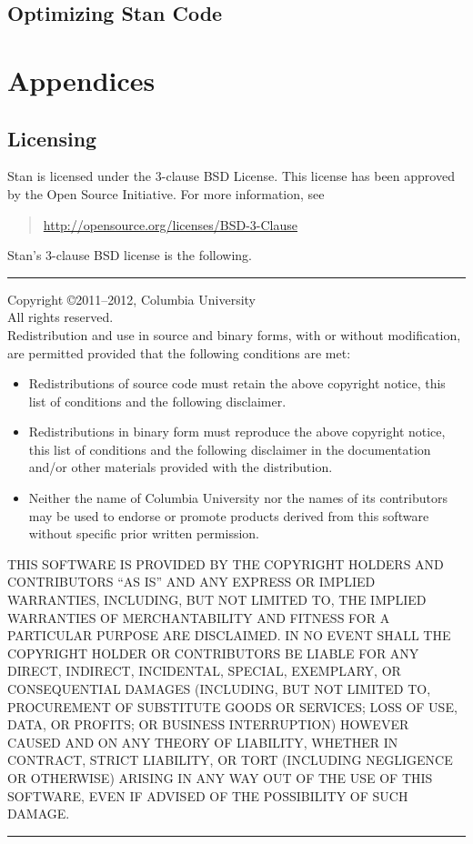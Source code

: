 \documentclass[10pt]{report}
\newcommand{\Stan}{Stan\xspace}
\begin{document}
\chapter{Optimizing \Stan Code}\label{optimization.chapter}


\appendix

\part*{Appendices}


\chapter{Licensing}

\Stan is licensed under the 3-clause BSD License.  This license has
been approved by the Open Source Initiative.  For more information,
see
%
\begin{quote}
\url{http://opensource.org/licenses/BSD-3-Clause}
\end{quote}
%
\Stan's 3-clause BSD license is the following.
\vspace*{6pt}

\noindent
\rule{\textwidth}{1pt}

\noindent
Copyright \copyright 2011--2012, Columbia University
\\
All rights reserved.
\\[12pt]
Redistribution and use in source and binary forms, with or without
modification, are permitted provided that the following conditions are
met:

\begin{itemize}
\item Redistributions of source code must retain the above copyright
  notice, this list of conditions and the following disclaimer.
\item Redistributions in binary form must reproduce the above
  copyright notice, this list of conditions and the following
  disclaimer in the documentation and/or other materials provided with
  the distribution.
\item Neither the name of Columbia University nor the names of its
  contributors may be used to endorse or promote products derived from
  this software without specific prior written permission.
\end{itemize}

{\small \noindent
 THIS SOFTWARE IS PROVIDED BY THE COPYRIGHT HOLDERS AND
  CONTRIBUTORS ``AS IS'' AND ANY EXPRESS OR IMPLIED WARRANTIES,
  INCLUDING, BUT NOT LIMITED TO, THE IMPLIED WARRANTIES OF
  MERCHANTABILITY AND FITNESS FOR A PARTICULAR PURPOSE ARE
  DISCLAIMED. IN NO EVENT SHALL THE COPYRIGHT HOLDER OR CONTRIBUTORS
  BE LIABLE FOR ANY DIRECT, INDIRECT, INCIDENTAL, SPECIAL, EXEMPLARY,
  OR CONSEQUENTIAL DAMAGES (INCLUDING, BUT NOT LIMITED TO, PROCUREMENT
  OF SUBSTITUTE GOODS OR SERVICES; LOSS OF USE, DATA, OR PROFITS; OR
  BUSINESS INTERRUPTION) HOWEVER CAUSED AND ON ANY THEORY OF
  LIABILITY, WHETHER IN CONTRACT, STRICT LIABILITY, OR TORT (INCLUDING
  NEGLIGENCE OR OTHERWISE) ARISING IN ANY WAY OUT OF THE USE OF THIS
  SOFTWARE, EVEN IF ADVISED OF THE POSSIBILITY OF SUCH DAMAGE.
}
\noindent
\rule{\textwidth}{1pt}
\end{document}
